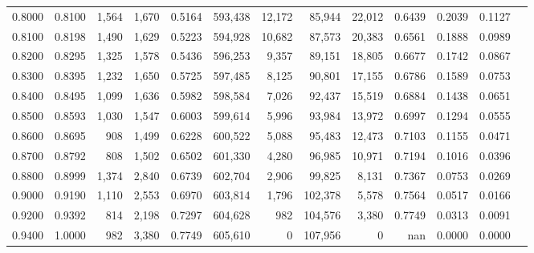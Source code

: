 \begin{tabular}{rrrrrrrrrrrrr}
0.8000 & 0.8100 &  1,564 & 1,670 &                                     0.5164 & 593,438 &  12,172 &  85,944 &  22,012 & 0.6439 & 0.2039 & 0.1127 \\
0.8100 & 0.8198 &  1,490 & 1,629 &                                     0.5223 & 594,928 &  10,682 &  87,573 &  20,383 & 0.6561 & 0.1888 & 0.0989 \\
0.8200 & 0.8295 &  1,325 & 1,578 &                                     0.5436 & 596,253 &   9,357 &  89,151 &  18,805 & 0.6677 & 0.1742 & 0.0867 \\
0.8300 & 0.8395 &  1,232 & 1,650 &                                     0.5725 & 597,485 &   8,125 &  90,801 &  17,155 & 0.6786 & 0.1589 & 0.0753 \\
0.8400 & 0.8495 &  1,099 & 1,636 &                                     0.5982 & 598,584 &   7,026 &  92,437 &  15,519 & 0.6884 & 0.1438 & 0.0651 \\
0.8500 & 0.8593 &  1,030 & 1,547 &                                     0.6003 & 599,614 &   5,996 &  93,984 &  13,972 & 0.6997 & 0.1294 & 0.0555 \\
0.8600 & 0.8695 &    908 & 1,499 &                                     0.6228 & 600,522 &   5,088 &  95,483 &  12,473 & 0.7103 & 0.1155 & 0.0471 \\
0.8700 & 0.8792 &    808 & 1,502 &                                     0.6502 & 601,330 &   4,280 &  96,985 &  10,971 & 0.7194 & 0.1016 & 0.0396 \\
0.8800 & 0.8999 &  1,374 & 2,840 &                                     0.6739 & 602,704 &   2,906 &  99,825 &   8,131 & 0.7367 & 0.0753 & 0.0269 \\
0.9000 & 0.9190 &  1,110 & 2,553 &                                     0.6970 & 603,814 &   1,796 & 102,378 &   5,578 & 0.7564 & 0.0517 & 0.0166 \\
0.9200 & 0.9392 &    814 & 2,198 &                                     0.7297 & 604,628 &     982 & 104,576 &   3,380 & 0.7749 & 0.0313 & 0.0091 \\
0.9400 & 1.0000 &    982 & 3,380 &                                     0.7749 & 605,610 &       0 & 107,956 &       0 &    nan & 0.0000 & 0.0000 \\
\bottomrule
\end{tabular}
